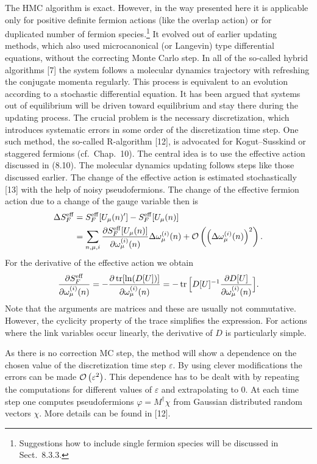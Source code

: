 The HMC algorithm is exact. However, in the way presented here it is applicable
only for positive definite fermion actions (like the overlap action) or for
duplicated number of fermion species.\footnote{Suggestions how to include
single fermion species will be discussed in Sect.~8.3.3.} It evolved out of
earlier updating methods, which also used microcanonical (or Langevin) type
differential equations, without the correcting Monte Carlo step.
In all of the so-called hybrid algorithms [7] the system follows a molecular
dynamics trajectory with refreshing the conjugate momenta regularly. This
process is equivalent to an evolution according to a stochastic differential
equation. It has been argued that systems out of equilibrium will be driven
toward equilibrium and stay there during the updating process. The crucial
problem is the necessary discretization, which introduces systematic errors in
some order of the discretization time step.
One such method, the so-called R-algorithm [12], is advocated for
Kogut--Susskind or staggered fermions (cf.\ Chap.~10). The central idea is to
use the effective action discussed in (8.10). The molecular dynamics updating
follows steps like those discussed earlier. The change of the effective action
is estimated stochastically [13] with the help of noisy pseudofermions. The
change of the effective fermion action due to a change of the gauge variable
then is
\begin{equation}
\begin{split}
\Delta S_F^{\mathrm{eff}} &= S_F^{\mathrm{eff}}[U_\mu(n)'] - S_F^{\mathrm{eff}}[U_\mu(n)]\\
&= \sum_{n,\mu,i}\frac{\partial S_F^{\mathrm{eff}}[U_\mu(n)]}{\partial\omega_\mu^{(i)}(n)}
   \Delta\omega_\mu^{(i)}(n)
   + \mathcal{O}\left(\Big(\Delta\omega_\mu^{(i)}(n)\Big)^2\right).
\end{split}
\end{equation}
For the derivative of the effective action we obtain
\begin{equation}
\frac{\partial S_F^{\mathrm{eff}}}{\partial\omega_\mu^{(i)}(n)}
= -\frac{\partial\operatorname{tr}[\ln(D[U])]}{\partial\omega_\mu^{(i)}(n)}
= -\operatorname{tr}\Big[D[U]^{-1}\frac{\partial D[U]}{\partial\omega_\mu^{(i)}(n)}\Big].
\end{equation}
Note that the arguments are matrices and these are usually not commutative.
However, the cyclicity property of the trace simplifies the expression. For
actions where the link variables occur linearly, the derivative of $D$ is
particularly simple.

As there is no correction MC step, the method will show a dependence on the
chosen value of the discretization time step $\varepsilon$. By using clever
modifications the errors can be made $\mathcal{O}\left(\varepsilon^2\right)$. This dependence
has to be dealt with by repeating the computations for different values of
$\varepsilon$ and extrapolating to 0.
At each time step one computes pseudofermions $\varphi = M^\dagger\chi$ from
Gaussian distributed random vectors $\chi$. More details can be found in [12].

